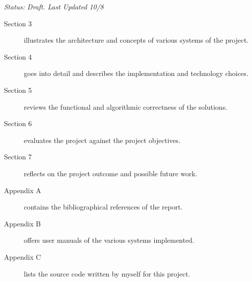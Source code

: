 \emph{Status: Draft. Last Updated 10/8}

\begin{description}
    \item[Section 3] illustrates the architecture and concepts of various systems of the project.
    \item[Section 4] goes into detail and describes the implementation and technology choices.
    \item[Section 5] reviews the functional and algorithmic correctness of the solutions.
    \item[Section 6] evaluates the project against the project objectives.
    \item[Section 7] reflects on the project outcome and possible future work.
    \item[Appendix A] contains the bibliographical references of the report.
    \item[Appendix B] offers user manuals of the various systems implemented.
    \item[Appendix C] lists the source code written by myself for this project.
\end{description}
